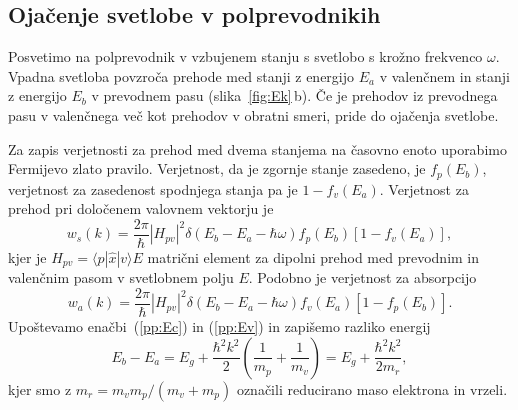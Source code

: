\subsection*{Ojačenje svetlobe v polprevodnikih}
Posvetimo na polprevodnik v vzbujenem stanju s svetlobo s krožno frekvenco $\omega$.
Vpadna svetloba povzroča prehode med stanji z energijo $E_a$ v valenčnem 
in stanji z energijo $E_b$ v prevodnem pasu (slika~\ref{fig:Ek}\,b).
Če je prehodov iz prevodnega pasu v valenčnega več kot prehodov v obratni
smeri, pride do ojačenja svetlobe. 

Za zapis verjetnosti za prehod med dvema stanjema na časovno
enoto uporabimo Fermijevo zlato pravilo. Verjetnost, da je zgornje stanje zasedeno, je 
$f_p(E_b)$, verjetnost za zasedenost spodnjega stanja pa je $1-f_v(E_a)$. Verjetnost 
za prehod pri določenem valovnem vektorju je
\begin{equation}  
w_s(k)=\frac{2\pi}{\hbar}|H_{pv}|^2\delta(E_b-E_a- \hbar\omega)
f_p(E_b)[1-f_v(E_a)],
\label{6.5}
\end{equation}
kjer je $H_{pv}= \langle p| \hat{x}|v\rangle E $ matrični element za dipolni
prehod  med prevodnim in valenčnim pasom v svetlobnem polju $E$. Podobno je
verjetnost za absorpcijo 
\begin{equation}  
w_a(k)=\frac{2\pi}{\hbar}|H_{pv}|^2\delta(E_b-E_a- \hbar\omega)
f_v(E_a)[1-f_p(E_b)].
\label{6.6}
\end{equation}
Upoštevamo enačbi~(\ref{pp:Ec}) in (\ref{pp:Ev}) in zapišemo razliko energij
\begin{equation}  
E_b-E_a= E_g + \frac{\hbar^2 k^2}{2}(\frac{1}{m_p}+ \frac{1}{m_v})= E_g + \frac{\hbar^2 k^2}{2m_r},
\label{6.8}
\end{equation}
kjer smo z $m_r=m_v m_p/(m_v+m_p)$ označili reducirano maso elektrona in vrzeli.

